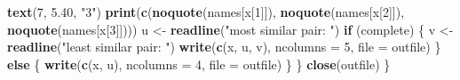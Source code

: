 \documentclass[
  12pt,
]{article}
\newenvironment{Shaded}{\begin{snugshade}}{\end{snugshade}}
\newcommand{\AttributeTok}[1]{\textcolor[rgb]{0.13,0.29,0.53}{#1}}
\newcommand{\ControlFlowTok}[1]{\textcolor[rgb]{0.13,0.29,0.53}{\textbf{#1}}}
\newcommand{\DecValTok}[1]{\textcolor[rgb]{0.00,0.00,0.81}{#1}}
\newcommand{\FloatTok}[1]{\textcolor[rgb]{0.00,0.00,0.81}{#1}}
\newcommand{\FunctionTok}[1]{\textcolor[rgb]{0.13,0.29,0.53}{\textbf{#1}}}
\newcommand{\NormalTok}[1]{#1}
\newcommand{\OtherTok}[1]{\textcolor[rgb]{0.56,0.35,0.01}{#1}}
\newcommand{\StringTok}[1]{\textcolor[rgb]{0.31,0.60,0.02}{#1}}
\begin{document}
\begin{Shaded}
\begin{Highlighting}[]
      \FunctionTok{text}\NormalTok{(}\DecValTok{7}\NormalTok{, }\FloatTok{5.40}\NormalTok{, }\StringTok{"3"}\NormalTok{)}
      \FunctionTok{print}\NormalTok{(}\FunctionTok{c}\NormalTok{(}\FunctionTok{noquote}\NormalTok{(names[x[}\DecValTok{1}\NormalTok{]]), }\FunctionTok{noquote}\NormalTok{(names[x[}\DecValTok{2}\NormalTok{]]), }\FunctionTok{noquote}\NormalTok{(names[x[}\DecValTok{3}\NormalTok{]])))}
\NormalTok{      u }\OtherTok{\textless{}{-}} \FunctionTok{readline}\NormalTok{(}\StringTok{"most similar pair: "}\NormalTok{)}
      \ControlFlowTok{if}\NormalTok{ (complete) \{}
\NormalTok{        v }\OtherTok{\textless{}{-}} \FunctionTok{readline}\NormalTok{(}\StringTok{"least similar pair: "}\NormalTok{)}
        \FunctionTok{write}\NormalTok{(}\FunctionTok{c}\NormalTok{(x, u, v), }\AttributeTok{ncolumns =} \DecValTok{5}\NormalTok{, }\AttributeTok{file =}\NormalTok{ outfile)}
\NormalTok{      \} }\ControlFlowTok{else}\NormalTok{ \{}
        \FunctionTok{write}\NormalTok{(}\FunctionTok{c}\NormalTok{(x, u), }\AttributeTok{ncolumns =} \DecValTok{4}\NormalTok{, }\AttributeTok{file =}\NormalTok{ outfile)}
\NormalTok{      \}}
\NormalTok{    \}}
    \FunctionTok{close}\NormalTok{(outfile)}
\NormalTok{  \}}


\end{Highlighting}
\end{Shaded}
\end{document}
